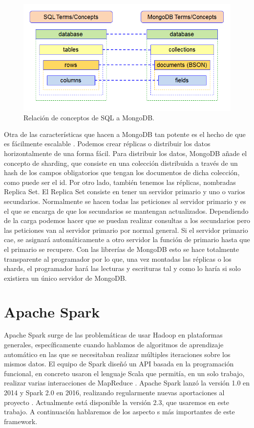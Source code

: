 \begin{figure}[htp]
\centering
\includegraphics[scale=0.57]{Imagenes/mongo1.png}
\caption{Relación de conceptos de SQL a MongoDB.}
\label{Mng-img-1}
\end{figure}


Otra de las características que hacen a MongoDB tan potente es el hecho de
que es fácilmente escalable \cite{Mng-1}. Podemos crear réplicas o
distribuir los datos horizontalmente de una forma fácil. Para distribuir
los datos, MongoDB añade el concepto de sharding, que consiste en una
colección distribuida a través de un hash de los campos obligatorios que
tengan los documentos de dicha colección, como puede ser el id. Por otro
lado, también tenemos las réplicas, nombradas Replica Set. El Replica Set
consiste en tener un servidor primario y uno o varios secundarios.
Normalmente se hacen todas las peticiones al servidor primario y es el que
se encarga de que los secundarios se mantengan actualizados. Dependiendo de
la carga podemos hacer que se puedan realizar consultas a los secundarios
pero las peticiones van al servidor primario por normal general. Si el
servidor primario cae, se asignará automáticamente a otro servidor la
función de primario hasta que el primario se recupere. Con las librerías de
MongoDB esto se hace totalmente transparente al programador por lo que, una
vez montadas las réplicas o los shards, el programador hará las lecturas y
escrituras tal y como lo haría si solo existiera un único servidor de
MongoDB.

\section{Apache Spark\label{Spark}}

Apache Spark surge de las problemáticas de usar Hadoop en plataformas
generales, específicamente cuando hablamos de algoritmos de aprendizaje
automático en las que se necesitaban realizar múltiples iteraciones sobre
los mismos datos. El equipo de Spark diseñó un API basada en la
programación funcional, en concreto usaron el lenguaje Scala que permitía,
en un solo trabajo, realizar varias interacciones de MapReduce
\cite{Spk-1}. Apache Spark lanzó la versión 1.0 en 2014 y Spark 2.0 en
2016, realizando regularmente nuevas aportaciones al proyecto \cite{Spk-2}.
Actualmente está disponible la versión 2.3, que usaremos en este trabajo. A
continuación hablaremos de los aspecto s más importantes de este framework.

